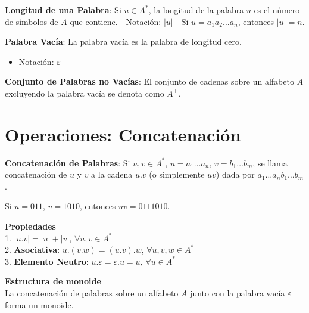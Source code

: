 \documentclass[12pt]{report} %
\begin{document}
\begin{definicion}
\textbf{Longitud de una Palabra}: Si $u \in A^*$, la longitud de la palabra $u$ es el número de símbolos de $A$ que contiene.  
- Notación: $\lvert u \rvert$  
- Si $u = a_1 a_2 \ldots a_n$, entonces $\lvert u \rvert = n$.  
\end{definicion}

\begin{definicion}
\textbf{Palabra Vacía}: La palabra vacía es la palabra de longitud cero.  
\begin{itemize}
    \item Notación: $\varepsilon$  
\end{itemize}
\end{definicion}

\begin{definicion}
\textbf{Conjunto de Palabras no Vacías}: El conjunto de cadenas sobre un alfabeto $A$ excluyendo la palabra vacía se denota como $A^+$.  
\end{definicion}

\hypertarget{operaciones-concatenaciuxf3n}{%
\section{Operaciones:
Concatenación}\label{operaciones-concatenaciuxf3n}}

\begin{definicion}
\textbf{Concatenación de Palabras}: Si $u, v \in A^*$, $u = a_1 \ldots a_n$, $v = b_1 \ldots b_m$, se llama concatenación de $u$ y $v$ a la cadena $u.v$ (o simplemente $uv$) dada por $a_1 \ldots a_n b_1 \ldots b_m$.
\end{definicion}

\begin{ejemplo}
Si $u = 011$, $v = 1010$, entonces $uv = 0111010$.
\end{ejemplo}

\textbf{Propiedades}\\
1. \(\lvert u.v \rvert = \lvert u \rvert + \lvert v \rvert\),
\(\forall u, v \in A^*\)\\
2. \textbf{Asociativa}: \(u.(v.w) = (u.v).w\),
\(\forall u, v, w \in A^*\)\\
3. \textbf{Elemento Neutro}: \(u.\varepsilon = \varepsilon.u = u\),
\(\forall u \in A^*\)

\textbf{Estructura de monoide}\\
La concatenación de palabras sobre un alfabeto \(A\) junto con la
palabra vacía \(\varepsilon\) forma un monoide.
\end{document}
